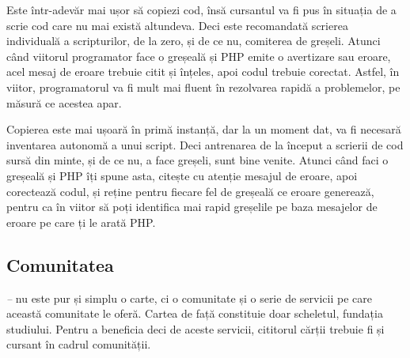 
Este într-adevăr mai ușor să copiezi cod, însă cursantul va fi pus în situația
de a scrie cod care nu mai există altundeva. Deci este recomandată scrierea
individuală a scripturilor, de la zero, și de ce nu, comiterea de greșeli.
Atunci când viitorul programator face o greșeală și PHP emite o avertizare sau
eroare, acel mesaj de eroare trebuie citit și înțeles, apoi codul trebuie
corectat. Astfel, în viitor, programatorul va fi mult mai fluent în rezolvarea
rapidă a problemelor, pe măsură ce acestea apar.

Copierea este mai ușoară în primă instanță, dar la un moment dat, va fi necesară
inventarea autonomă a unui script. Deci antrenarea de la început a scrierii de
cod sursă din minte, și de ce nu, a face greșeli, sunt bine venite. Atunci când
faci o greșeală și PHP îți spune asta, citește cu atenție mesajul de eroare,
apoi corectează codul, și reține pentru fiecare fel de greșeală ce eroare
generează, pentru ca în viitor să poți identifica mai rapid greșelile pe baza
mesajelor de eroare pe care ți le arată PHP.


\subsection*{Comunitatea}
{}

\textit{{\thetitle} -- {\thesubtitle}} nu este pur și simplu o carte, ci
o comunitate și o serie de servicii pe care această comunitate le oferă. Cartea
de față constituie doar scheletul, fundația studiului. Pentru a beneficia deci
de aceste servicii, cititorul cărții trebuie fi și cursant în cadrul
comunității.

